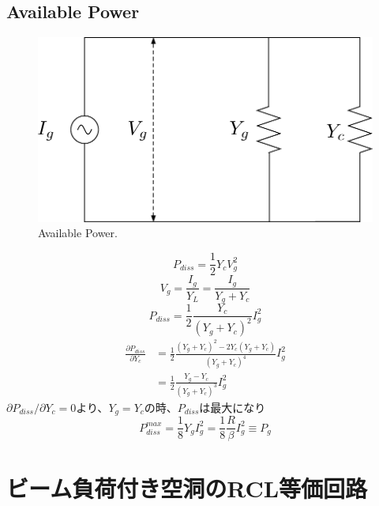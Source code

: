 \documentclass[book]{jlreq}
\begin{document}
\subsection{Available Power}
%
\begin{figure}[hbt]
    \begin{center}
        \includegraphics[width=\linewidth]{figs/Available_Power.pdf}
        \caption{Available Power.}
        \label{fig:Available_Power}
    \end{center}
\end{figure}
%
\begin{equation}
    P_{diss} = \frac{1}{2}Y_c V_g^2
\end{equation}
%
\begin{equation}
    V_g = \frac{I_g}{Y_L}=\frac{I_g}{Y_g+Y_c}
\end{equation}
%
\begin{equation}
    P_{diss} = \frac{1}{2}\frac{Y_c}{(Y_g+Y_c)^2}I_g^2
\end{equation}
%
\begin{equation}
    \begin{split}
        \frac{\partial P_{diss}}{\partial Y_c} &= \frac{1}{2}\frac{(Y_g + Y_c)^2 - 2Y_c(Y_g+Y_c)}{(Y_g+Y_c)^4} I_g^2 \\
        &= \frac{1}{2}\frac{Y_g-Y_c}{(Y_g+Y_c)^3} I_g^2
    \end{split}
\end{equation}
%
$\partial P_{diss}/\partial Y_c = 0$より、$Y_g = Y_c$の時、$P_{diss}$は最大になり
%
\begin{equation}
    P_{diss}^{max} = \frac{1}{8} Y_g I_g^2 = \frac{1}{8}\frac{R}{\beta}I_g^2 \equiv P_g
\end{equation}



\section{ビーム負荷付き空洞のRCL等価回路}
\end{document}
